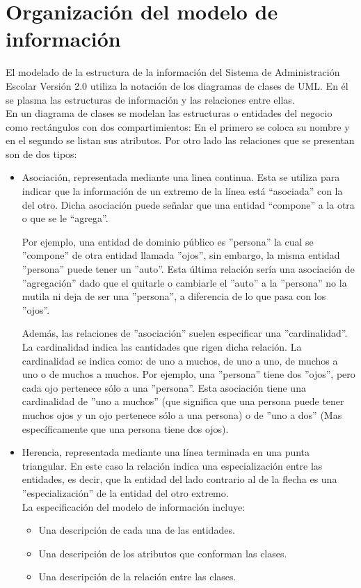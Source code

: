 \newpage
\section{Organización del modelo de información}

El modelado de la estructura de la información del Sistema de Administración Escolar Versión 2.0 utiliza la notación de los diagramas de clases de UML. En él se plasma las estructuras de información y las relaciones entre ellas.\\

En un diagrama de clases se modelan las estructuras o entidades del negocio como rectángulos con dos compartimientos: En el primero se coloca su nombre y en el segundo se listan sus atributos. Por otro lado las relaciones que se presentan son de dos tipos:

\begin{itemize}
	\item Asociación, representada mediante una linea continua. Esta se utiliza para indicar que la información de un extremo de la línea está “asociada” con la del otro. Dicha asociación puede señalar que una entidad “compone” a la otra o que se le “agrega”.
	
	Por ejemplo, una entidad de dominio público es ''persona'' la cual se ''compone'' de otra entidad llamada ''ojos'', sin embargo, la misma entidad ''persona'' puede tener un ''auto''. Esta última relación sería una asociación de ''agregación'' dado que el quitarle o cambiarle el ''auto'' a la ''persona'' no la mutila ni deja de ser una ''persona'', a diferencia de lo que pasa con los ''ojos''.
	
	Además, las relaciones de ''asociación'' suelen especificar una ''cardinalidad''. La cardinalidad indica las cantidades que rigen dicha relación. La cardinalidad se indica como: de uno a muchos, de uno a uno, de muchos a uno o de muchos a muchos. Por ejemplo, una ''persona'' tiene dos ''ojos'', pero cada ojo pertenece sólo a una ''persona''. Esta asociación tiene una cardinalidad de ''uno a muchos'' (que significa que una persona puede tener muchos ojos y un ojo pertenece sólo a una persona) o de ''uno a dos'' (Mas específicamente que una persona tiene dos ojos).
	
	\item Herencia, representada mediante una línea terminada en una punta triangular. En este caso la relación indica una especialización entre las entidades, es decir, que la entidad del lado contrario al de la flecha es una ''especialización'' de la entidad del otro extremo. \\
	
	La especificación del modelo de información incluye:
	\begin{itemize}
		\item Una descripción de cada una de las entidades.
		\item Una descripción de los atributos que conforman las clases.
		\item Una descripción de la relación entre las clases.
	\end{itemize}
\end{itemize}
